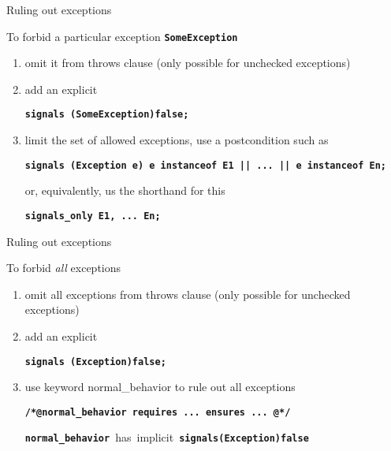 \documentclass[
pdf,
nocolorBG,
slideColor,
erik,
]{prosper}
\newcommand{\code}[1]{{\rm \texttt{\textbf{\small #1}}}}
\begin{document}
\begin{slide}{Ruling out exceptions}
\vspace*{-4ex}

To forbid a particular exception \code{SomeException}
\begin{enumerate}
\item omit it from throws clause (only possible for unchecked exceptions)
\item add an explicit
\begin{alltt} \code{\scriptsize{\blue signals} (SomeException){\green false};}
\end{alltt}

\item limit the set of allowed exceptions, use a postcondition such as
\begin{alltt}\code{\scriptsize    signals (Exception e) e instanceof E1 
                       || ... 
                       || e instanceof En;}
\end{alltt}
or, equivalently, us the shorthand for this
\begin{alltt}\code{\scriptsize    signals_only E1, ... En;}
\end{alltt}

\end{enumerate}

\end{slide}


\begin{slide}{Ruling out exceptions}
\vspace*{-4ex}

To forbid \textit{all} exceptions
\begin{enumerate}
\item omit all exceptions from throws clause (only possible for unchecked exceptions)
\item add an explicit
\begin{alltt} \code{\scriptsize{\blue signals} (Exception){\green false};}
\end{alltt}
\item
use keyword {\blue normal\_behavior} to rule out all exceptions
\begin{alltt} \code{\scriptsize {\green /*@}{\blue normal\_behavior}
       {\black requires} ...
       {\black ensures}  ...
    {\green @*/}
}
\end{alltt}
\mbox{\code{normal\_behavior} has implicit
\code{signals(Exception)false}}
\end{enumerate}

\end{slide}
\end{document}
